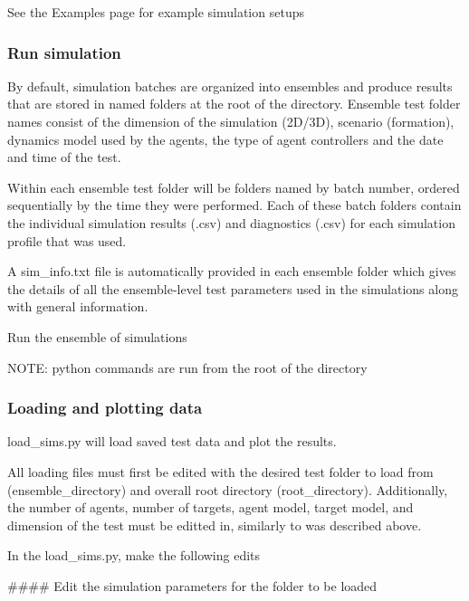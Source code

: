 See the Examples page for example simulation setups

\subsubsection*{Run simulation}

By default, simulation batches are organized into ensembles and produce results that are stored in named folders at the root of the directory. Ensemble test folder names consist of the dimension of the simulation (2D/3D), scenario (\textquotesingle{}formation\textquotesingle{}), dynamics model used by the agents, the type of agent controllers and the date and time of the test.

Within each ensemble test folder will be folders named by batch number, ordered sequentially by the time they were performed. Each of these batch folders contain the individual simulation results (.csv) and diagnostics (.csv) for each simulation profile that was used.

A sim\+\_\+info.\+txt file is automatically provided in each ensemble folder which gives the details of all the ensemble-\/level test parameters used in the simulations along with general information.

Run the ensemble of simulations 
\begin{DoxyCode}{0}
\end{DoxyCode}


N\+O\+TE\+: python commands are run from the root of the directory

\subsubsection*{Loading and plotting data}

load\+\_\+sims.\+py will load saved test data and plot the results.

All loading files must first be edited with the desired test folder to load from (ensemble\+\_\+directory) and overall root directory (root\+\_\+directory). Additionally, the number of agents, number of targets, agent model, target model, and dimension of the test must be editted in, similarly to was described above.

In the load\+\_\+sims.\+py, make the following edits

\#\#\#\# Edit the simulation parameters for the folder to be loaded 
\begin{DoxyCode}{0}
\DoxyCodeLine{\#\#\#\#\#\#\#\#\#\#\#\#\#\#\#\#\#\#\#\#\#\#\#\#\#\#\#\#\#\#\#\#\#\#\#\#\#\#\#\#\#\#\#\#\#\#\#\#\#\#\#\#\#\#\#\#\#\#\#\#\#\#\#\#\#\#\#\#\#\#\#\#\#}
\DoxyCodeLine{}
\DoxyCodeLine{}
\DoxyCodeLine{}
\end{DoxyCode}


